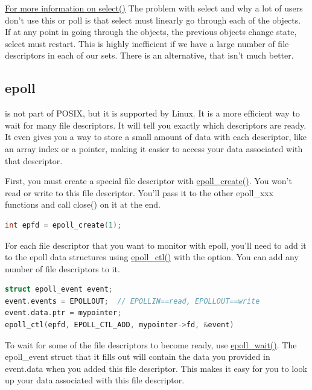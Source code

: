 \href{http://pubs.opengroup.org/onlinepubs/9699919799/functions/select.html}{For more information on select()}
The problem with select and why a lot of users don't use this or poll is that select must linearly go through each of the objects.
If at any point in going through the objects, the previous objects change state, select must restart.
This is highly inefficient if we have a large number of file descriptors in each of our sets.
There is an alternative, that isn't much better.

\subsection{epoll}

 is not part of POSIX, but it is supported by Linux.
It is a more efficient way to wait for many file descriptors.
It will tell you exactly which descriptors are ready.
It even gives you a way to store a small amount of data with each descriptor, like an array index or a pointer, making it easier to access your data associated with that descriptor.

First, you must create a special file descriptor with \href{http://linux.die.net/man/2/epoll_create}{epoll\_create()}.
You won't read or write to this file descriptor.
You'll pass it to the other epoll\_xxx functions and call close() on it at the end.

\begin{lstlisting}[language=C]
int epfd = epoll_create(1);
\end{lstlisting}

For each file descriptor that you want to monitor with epoll, you'll need to add it to the epoll data structures using \href{http://linux.die.net/man/2/epoll_ctl}{epoll\_ctl()} with the  option.
You can add any number of file descriptors to it.

\begin{lstlisting}[language=C]
struct epoll_event event;
event.events = EPOLLOUT;  // EPOLLIN==read, EPOLLOUT==write
event.data.ptr = mypointer;
epoll_ctl(epfd, EPOLL_CTL_ADD, mypointer->fd, &event)
\end{lstlisting}

To wait for some of the file descriptors to become ready, use \href{http://linux.die.net/man/2/epoll_wait}{epoll\_wait()}.
The epoll\_event struct that it fills out will contain the data you provided in event.data when you added this file descriptor.
This makes it easy for you to look up your data associated with this file descriptor.

